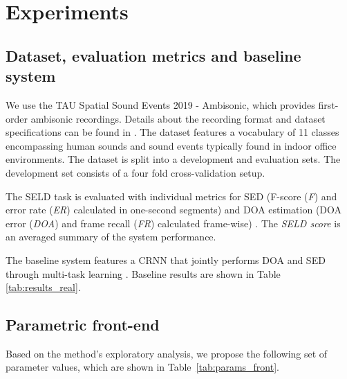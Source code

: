 
\section{Experiments}
\label{sec:expe}

\subsection{Dataset, evaluation metrics and baseline system}
\label{ssec:dataset}
We use the TAU Spatial Sound Events 2019 - Ambisonic, which provides first-order ambisonic recordings.
Details about the recording format and dataset specifications can be found in \cite{Adavanne2019_DCASE}.
The dataset features a vocabulary of 11 classes encompassing human sounds and sound events typically found in indoor office environments.
The dataset is split into a development and evaluation sets. 
The development set consists of a four fold cross-validation setup.

The SELD task is evaluated with individual metrics for SED (F-score (\textit{F}) and error rate (\textit{ER}) calculated in one-second segments) and DOA estimation (DOA error (\textit{DOA}) and frame recall (\textit{FR}) calculated frame-wise) \cite{Adavanne2018_JSTSP}.
The \textit{SELD score} is an averaged summary of the system performance.

The baseline system features a CRNN that jointly performs DOA and SED through multi-task learning \cite{Adavanne2018_JSTSP}.
Baseline results are shown in Table \ref{tab:results_real}.


\subsection{Parametric front-end}
\label{ssec:param_frontend}

Based on the method's exploratory analysis, we propose the following set of parameter values, which are shown in Table~\ref{tab:params_front}.


